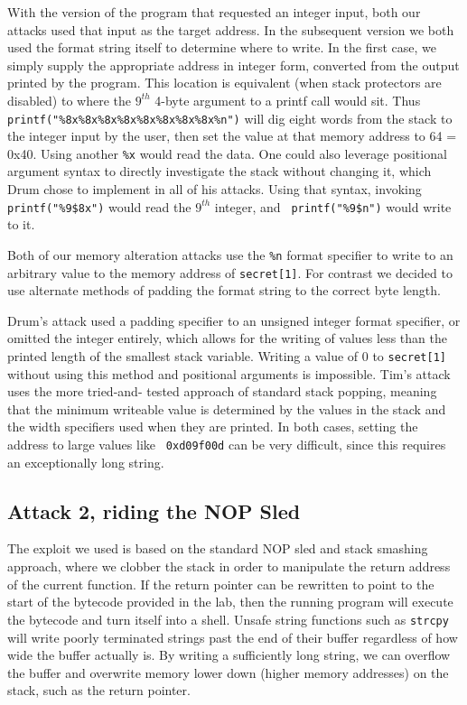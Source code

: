 With the version of the program that requested an integer input, both our attacks used that input as the target address.
In the subsequent version we both used the format string itself to determine where to write. In the first case, we
simply supply the appropriate address in integer form, converted from the output printed by the program. This location
is equivalent (when stack protectors are disabled) to where the $9^{th}$ 4-byte argument to a printf call would sit. Thus
{\tt printf("\%8x\%8x\%8x\%8x\%8x\%8x\%8x\%8x\%n")} will dig eight words from the stack to the integer input by the
user, then set the value at that memory address to 64 = 0x40. Using another {\tt\%x} would read the data. One could also
leverage positional argument syntax to directly investigate the stack without changing it, which Drum chose to implement
in all of his attacks. Using that syntax, invoking {\tt printf("\%9\$8x")} would read the $9^{th}$ integer, and {\tt
printf("\%9\$n")} would write to it.

Both of our memory alteration attacks use the {\tt \%n} format specifier to write to an arbitrary value to the memory
address of {\tt secret[1]}. For contrast we decided to use alternate methods of padding the format string to the correct
byte length.

Drum's attack used a padding specifier to an unsigned integer format specifier, or omitted the integer entirely, which
allows for the writing of values less than the printed length of the smallest stack variable. Writing a value of 0 to
{\tt secret[1]} without using this method and positional arguments is impossible. Tim's attack uses the more tried-and-
tested approach of standard stack popping, meaning that the minimum writeable value is determined by the values in the
stack and the width specifiers used when they are printed. In both cases, setting the address to large values like {\tt
0xd09f00d} can be very difficult, since this requires an exceptionally long string.

\subsection{Attack 2, riding the NOP Sled}

The exploit we used is based on the standard NOP sled and stack smashing approach, where we clobber the stack in order
to manipulate the return address of the current function. If the return pointer can be rewritten to point to the start
of the bytecode provided in the lab, then the running program will execute the bytecode and turn itself into a shell.
Unsafe string functions such as {\tt strcpy} will write poorly terminated strings past the end of their buffer
regardless of how wide the buffer actually is. By writing a sufficiently long string, we can overflow the buffer and
overwrite memory lower down (higher memory addresses) on the stack, such as the return pointer.

